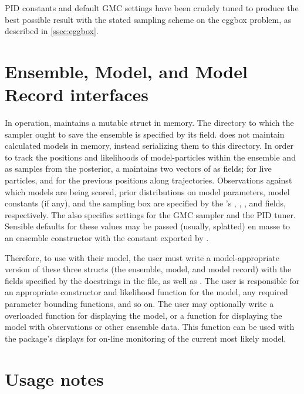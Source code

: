 PID constants and default GMC settings have been crudely tuned to produce the best possible result with the stated sampling scheme on the eggbox problem, as described in \autoref{ssec:eggbox}.

\section{Ensemble, Model, and Model Record interfaces}
In operation,  maintains a  mutable struct in memory. The directory to which the sampler ought to save the ensemble is specified by its  field.  does not maintain calculated models in memory, instead serializing them to this directory. In order to track the positions and likelihoods of model-particles within the ensemble and as samples from the posterior, a  maintains two vectors of  as fields;  for live particles, and  for the previous positions along trajectories. Observations against which models are being scored, prior distributions on model parameters, model constants (if any), and the sampling box are specified by the 's , , , and  fields, respectively. The  also specifies settings for the GMC sampler and the PID tuner. Sensible defaults for these values may be passed (usually, splatted) en masse to an ensemble constructor with the  constant exported by .

Therefore, to use  with their model, the user must write a model-appropriate version of these three structs (the ensemble, model, and model record) with the fields specified by the docstrings in the  file, as well as . The user is responsible for an appropriate constructor and likelihood function for the model, any required parameter bounding functions, and so on. The user may optionally write a overloaded  function for displaying the model, or a  function for displaying the model with observations or other ensemble data. This function can be used with the package's  displays for on-line monitoring of the current most likely model.

\section{Usage notes}
